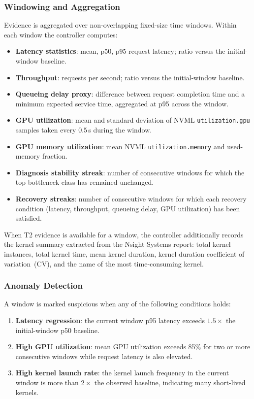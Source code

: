 \subsubsection{Windowing and Aggregation}

Evidence is aggregated over non-overlapping fixed-size time windows. Within each window the controller computes:

\begin{itemize}
  \raggedright
  \item \textbf{Latency statistics}: mean, p50, p95 request latency; ratio versus the initial-window baseline.
  \item \textbf{Throughput}: requests per second; ratio versus the initial-window baseline.
  \item \textbf{Queueing delay proxy}: difference between request completion time and a minimum expected service time, aggregated at p95 across the window.
  \item \textbf{GPU utilization}: mean and standard deviation of NVML \texttt{utilization.gpu} samples taken every 0.5\,s during the window.
  \item \textbf{GPU memory utilization}: mean NVML \texttt{utilization.memory} and used-memory fraction.
  \item \textbf{Diagnosis stability streak}: number of consecutive windows for which the top bottleneck class has remained unchanged.
  \item \textbf{Recovery streaks}: number of consecutive windows for which each recovery condition (latency, throughput, queueing delay, GPU utilization) has been satisfied.
\end{itemize}

When T2 evidence is available for a window, the controller additionally records the kernel summary extracted from the Nsight Systems report: total kernel instances, total kernel time, mean kernel duration, kernel duration coefficient of variation~(CV), and the name of the most time-consuming kernel.


\subsubsection{Anomaly Detection}

A window is marked suspicious when any of the following conditions holds:

\begin{enumerate}
  \item \textbf{Latency regression}: the current window p95 latency exceeds $1.5\times$ the initial-window p50 baseline.
  \item \textbf{High GPU utilization}: mean GPU utilization exceeds 85\% for two or more consecutive windows while request latency is also elevated.
  \item \textbf{High kernel launch rate}: the kernel launch frequency in the current window is more than $2\times$ the observed baseline, indicating many short-lived kernels.
\end{enumerate}

